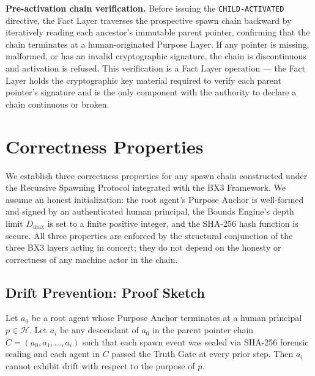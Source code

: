 \textbf{Pre-activation chain verification.} Before issuing the \texttt{CHILD-ACTIVATED} directive, the Fact Layer traverses the prospective spawn chain backward by iteratively reading each ancestor's immutable parent pointer, confirming that the chain terminates at a human-originated Purpose Layer. If any pointer is missing, malformed, or has an invalid cryptographic signature, the chain is discontinuous and activation is refused. This verification is a Fact Layer operation — the Fact Layer holds the cryptographic key material required to verify each parent pointer's signature and is the only component with the authority to declare a chain continuous or broken.


\section{Correctness Properties}
\label{sec:correctness-properties}

We establish three correctness properties for any spawn chain constructed under the Recursive Spawning Protocol integrated with the BX3 Framework. We assume an honest initialization: the root agent's Purpose Anchor is well-formed and signed by an authenticated human principal, the Bounds Engine's depth limit $D_{\max}$ is set to a finite positive integer, and the SHA-256 hash function is secure. All three properties are enforced by the structural conjunction of the three BX3 layers acting in concert; they do not depend on the honesty or correctness of any machine actor in the chain.

\subsection{Drift Prevention: Proof Sketch}

\begin{theorem}\label{th:drift-prevention}
Let $a_0$ be a root agent whose Purpose Anchor terminates at a human principal $p \in \mathcal{H}$. Let $a_i$ be any descendant of $a_0$ in the parent pointer chain $C = (a_0, a_1, \ldots, a_i)$ such that each spawn event was sealed via SHA-256 forensic sealing and each agent in $C$ passed the Truth Gate at every prior step. Then $a_i$ cannot exhibit drift with respect to the purpose of $p$.
\end{theorem}

